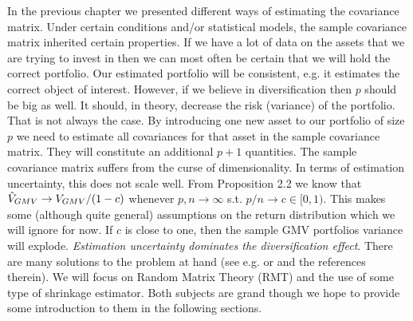 \documentclass[]{book}\usepackage{knitr}
\begin{document}
In the previous chapter we presented different ways of estimating the covariance matrix. Under certain conditions and/or statistical models, the sample covariance matrix inherited certain properties. 
If we have a lot of data on the assets that we are trying to invest in then we can most often be certain that we will hold the correct portfolio.
Our estimated portfolio will be consistent, e.g. it estimates the correct object of interest. 
However, if we believe in diversification then $p$ should be big as well. 
It should, in theory, decrease the risk (variance) of the portfolio. 
That is not always the case.
By introducing one new asset to our portfolio of size $p$ we need to estimate all covariances for that asset in the sample covariance matrix. They will constitute an additional $p+1$ quantities. 
The sample covariance matrix suffers from the curse of dimensionality. 
In terms of estimation uncertainty, this does not scale well.
From \citet{bodnar2016optimal} Proposition 2.2 we know that $\hat{V}_{GMV} \rightarrow V_{GMV}/(1-c)$ whenever $p,n \rightarrow \infty$ s.t. $p/n \rightarrow c \in [0,1)$. This makes some (although quite general) assumptions on the return distribution which we will ignore for now. If $c$ is close to one, then the sample GMV portfolios variance will explode. \textit{Estimation uncertainty dominates the diversification effect}. There are many solutions to the problem at hand (see e.g. \citet{lw17} or \citet{bodnar2021recent} and the references therein). We will focus on Random Matrix Theory (RMT) and the use of some type of shrinkage estimator. Both subjects are grand though we hope to provide some introduction to them in the following sections.
\end{document}
